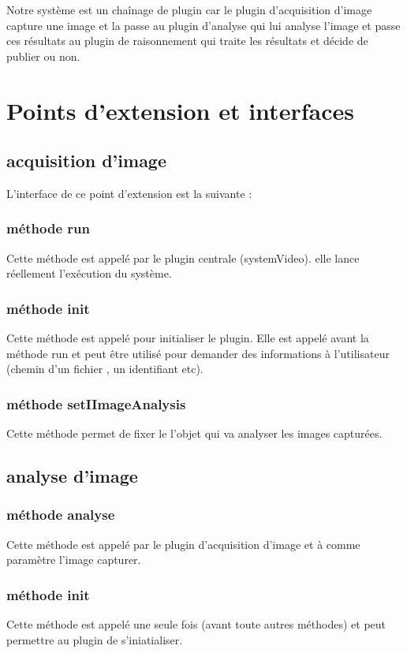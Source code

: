 \documentclass[a4paper , 12pt]{article}
\begin{document}
Notre système est un chaînage de plugin car le plugin d'acquisition d'image capture une image et la passe au plugin d'analyse qui lui analyse l'image et passe ces résultats au plugin de raisonnement qui traite les résultats et décide de publier ou non.

  \section{Points d'extension et interfaces} 
  \subsection{acquisition d'image}
  L'interface de ce point d'extension est la suivante :
  
  \subsubsection*{méthode run}
  Cette méthode est appelé par le plugin centrale (systemVideo). elle lance réellement l'exécution du système.
  \subsubsection*{méthode init}
  Cette méthode est appelé pour initialiser le plugin. Elle est appelé avant la méthode run et peut être utilisé pour demander des informations à l'utilisateur (chemin d'un fichier , un identifiant etc).
  \subsubsection*{méthode setIImageAnalysis}
  Cette méthode permet de fixer le l'objet qui va analyser les images capturées.
  \subsection{analyse d'image}
 
  \subsubsection*{méthode analyse}
  Cette méthode est appelé par le plugin d'acquisition d'image et à comme paramètre l'image capturer.
  \subsubsection*{méthode init}
  Cette méthode est appelé une seule fois (avant toute autres méthodes) et peut permettre au plugin de s'iniatialiser.
\end{document}
